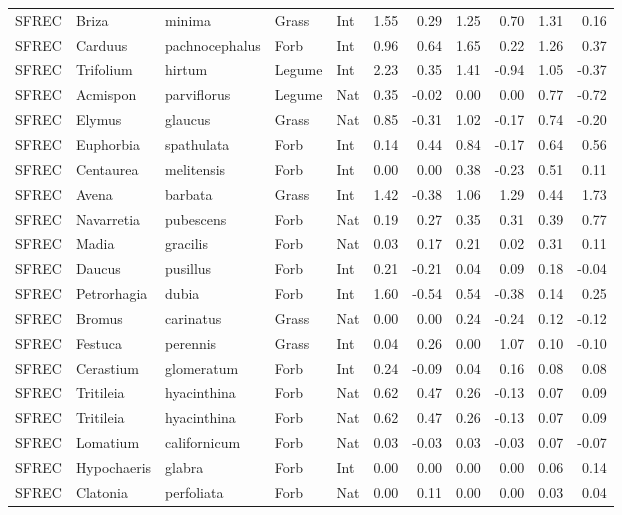 \documentclass[twoside,12pt,final]{ucthesis-CA2012}
\begin{document}
\begin{ucmainmatter}
\begin{table}[ht]
{\begin{tabular}{lllllrrrrrr}
  SFREC & Briza & minima & Grass & Int & 1.55 & 0.29 & 1.25 & 0.70 & 1.31 & 0.16 \\ 
  SFREC & Carduus & pachnocephalus & Forb & Int & 0.96 & 0.64 & 1.65 & 0.22 & 1.26 & 0.37 \\ 
  SFREC & Trifolium & hirtum & Legume & Int & 2.23 & 0.35 & 1.41 & -0.94 & 1.05 & -0.37 \\ 
  SFREC & Acmispon & parviflorus & Legume & Nat & 0.35 & -0.02 & 0.00 & 0.00 & 0.77 & -0.72 \\ 
  SFREC & Elymus & glaucus & Grass & Nat & 0.85 & -0.31 & 1.02 & -0.17 & 0.74 & -0.20 \\ 
  SFREC & Euphorbia & spathulata & Forb & Int & 0.14 & 0.44 & 0.84 & -0.17 & 0.64 & 0.56 \\ 
  SFREC & Centaurea & melitensis & Forb & Int & 0.00 & 0.00 & 0.38 & -0.23 & 0.51 & 0.11 \\ 
  SFREC & Avena & barbata & Grass & Int & 1.42 & -0.38 & 1.06 & 1.29 & 0.44 & 1.73 \\ 
  SFREC & Navarretia & pubescens & Forb & Nat & 0.19 & 0.27 & 0.35 & 0.31 & 0.39 & 0.77 \\ 
  SFREC & Madia & gracilis & Forb & Nat & 0.03 & 0.17 & 0.21 & 0.02 & 0.31 & 0.11 \\ 
  SFREC & Daucus & pusillus & Forb & Int & 0.21 & -0.21 & 0.04 & 0.09 & 0.18 & -0.04 \\ 
  SFREC & Petrorhagia & dubia & Forb & Int & 1.60 & -0.54 & 0.54 & -0.38 & 0.14 & 0.25 \\ 
  SFREC & Bromus & carinatus & Grass & Nat & 0.00 & 0.00 & 0.24 & -0.24 & 0.12 & -0.12 \\ 
  SFREC & Festuca & perennis & Grass & Int & 0.04 & 0.26 & 0.00 & 1.07 & 0.10 & -0.10 \\ 
  SFREC & Cerastium & glomeratum & Forb & Int & 0.24 & -0.09 & 0.04 & 0.16 & 0.08 & 0.08 \\ 
  SFREC & Tritileia & hyacinthina & Forb & Nat & 0.62 & 0.47 & 0.26 & -0.13 & 0.07 & 0.09 \\ 
  SFREC & Tritileia & hyacinthina & Forb & Nat & 0.62 & 0.47 & 0.26 & -0.13 & 0.07 & 0.09 \\ 
  SFREC & Lomatium & californicum & Forb & Nat & 0.03 & -0.03 & 0.03 & -0.03 & 0.07 & -0.07 \\ 
  SFREC & Hypochaeris & glabra & Forb & Int & 0.00 & 0.00 & 0.00 & 0.00 & 0.06 & 0.14 \\ 
  SFREC & Clatonia & perfoliata & Forb & Nat & 0.00 & 0.11 & 0.00 & 0.00 & 0.03 & 0.04 \\ 

\end{tabular}}
\end{table}
\end{ucmainmatter}
\end{document}
